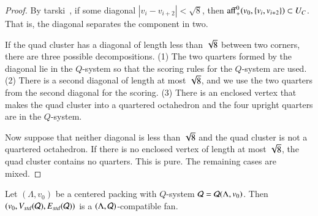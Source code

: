 \begin{proof}
By tarski~, if some diagonal $|v_i-v_{i+2}|<\sqrt8$,
then ${\operatorname{aff}}_+^0(v_0,\{v_i,v_{i+2}\})\subset U_C$. That is, the
diagonal separates the component in two.

If the quad cluster has a diagonal of length less than $\sqrt8$
between two corners, there are three possible decompositions. (1)
The two quarters formed by the diagonal lie in the $Q$-system so
that the scoring rules for the $Q$-system are used.  (2) There is
a second diagonal of length at most $\sqrt8$, and we use the two
quarters from the second diagonal for the scoring. (3) There is an
enclosed vertex that makes the quad cluster into a quartered
octahedron and the four upright quarters are in the $Q$-system.

Now suppose that neither diagonal is less than $\sqrt8$ and the
quad cluster is not a quartered octahedron. If there is no
enclosed vertex of length at most $\sqrt8$, the quad cluster
contains no quarters. This is pure.
The remaining cases are mixed.
\end{proof}





%

\begin{lemma}
Let $(\Lambda,v_0)$ be a centered packing with $Q$-system ${\mathcal Q} = {\mathcal Q}(\Lambda,v_0)$. 
Then $(v_0,V_{std}({\mathcal Q}),E_{std}({\mathcal Q}))$ is a
$(\Lambda,{\mathcal Q})$-compatible fan.
\end{lemma}

